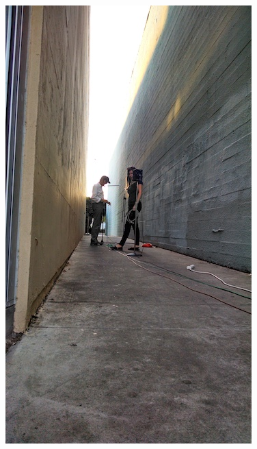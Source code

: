 \documentclass{aes137}
\begin{document}
\begin{figure}[h!]
\begin{minipage}[b]{0.3\linewidth} \centering
\includegraphics[width=\textwidth, trim=0mm 16mm 0mm 18mm, clip]{images/pic_P14.jpg}
\end{minipage}
\hspace{0.01\linewidth}
\begin{minipage}[b]{0.68\linewidth} \centering

\end{minipage}
\end{figure}
\end{document}

